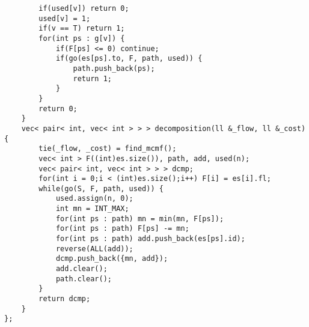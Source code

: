 \documentclass[12pt]{article}
\begin{document}
\begin{verbatim}
        if(used[v]) return 0;
        used[v] = 1;
        if(v == T) return 1;
        for(int ps : g[v]) {
            if(F[ps] <= 0) continue;
            if(go(es[ps].to, F, path, used)) {
                path.push_back(ps);
                return 1;
            }
        }
        return 0;
    }
    vec< pair< int, vec< int > > > decomposition(ll &_flow, ll &_cost) {
        tie(_flow, _cost) = find_mcmf();
        vec< int > F((int)es.size()), path, add, used(n);
        vec< pair< int, vec< int > > > dcmp;
        for(int i = 0;i < (int)es.size();i++) F[i] = es[i].fl;
        while(go(S, F, path, used)) {
            used.assign(n, 0);
            int mn = INT_MAX;
            for(int ps : path) mn = min(mn, F[ps]);
            for(int ps : path) F[ps] -= mn;
            for(int ps : path) add.push_back(es[ps].id);
            reverse(ALL(add));
            dcmp.push_back({mn, add});
            add.clear();
            path.clear();
        }
        return dcmp;
    }
};
\end{verbatim}
\end{document}
